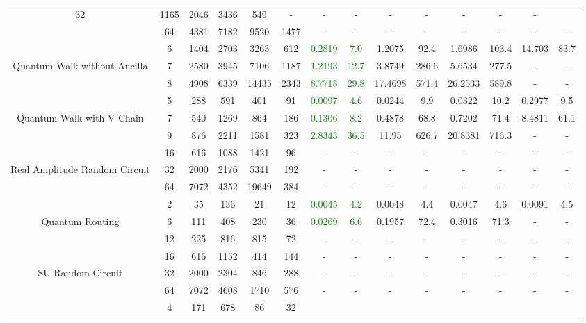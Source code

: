 \begin{table}[htb]
{\begin{tabular}{|c|c|c|c|c|c|c|c|c|c|c|c|c|c|}
32 & 1165 & 2046 & 3436 & 549
 & - & -
 & - & -
 & - & -
 & - & -
 \\
 & 
64 & 4381 & 7182 & 9520 & 1477
 & - & -
 & - & -
 & - & -
 & - & -
 \\
\hline
 & 
6 & 1404 & 2703 & 3263 & 612
 & \textcolor{green}{0.2819} & \textcolor{green}{7.0}
 & 1.2075 & 92.4
 & 1.6986 & 103.4
 & 14.703 & 83.7
 \\
Quantum Walk without Ancilla & 
7 & 2580 & 3945 & 7106 & 1187
 & \textcolor{green}{1.2193} & \textcolor{green}{12.7}
 & 3.8749 & 286.6
 & 5.6534 & 277.5
 & - & -
 \\
 & 
8 & 4908 & 6339 & 14435 & 2343
 & \textcolor{green}{8.7718} & \textcolor{green}{29.8}
 & 17.4698 & 571.4
 & 26.2533 & 589.8
 & - & -
 \\
\hline
 & 
5 & 288 & 591 & 401 & 91
 & \textcolor{green}{0.0097} & \textcolor{green}{4.6}
 & 0.0244 & 9.9
 & 0.0322 & 10.2
 & 0.2977 & 9.5
 \\
Quantum Walk with V-Chain & 
7 & 540 & 1269 & 864 & 186
 & \textcolor{green}{0.1306} & \textcolor{green}{8.2}
 & 0.4878 & 68.8
 & 0.7202 & 71.4
 & 8.4811 & 61.1
 \\
 & 
9 & 876 & 2211 & 1581 & 323
 & \textcolor{green}{2.8343} & \textcolor{green}{36.5}
 & 11.95 & 626.7
 & 20.8381 & 716.3
 & - & -
 \\
\hline
 & 
16 & 616 & 1088 & 1421 & 96
 & - & -
 & - & -
 & - & -
 & - & -
 \\
Real Amplitude Random Circuit & 
32 & 2000 & 2176 & 5341 & 192
 & - & -
 & - & -
 & - & -
 & - & -
 \\
 & 
64 & 7072 & 4352 & 19649 & 384
 & - & -
 & - & -
 & - & -
 & - & -
 \\
\hline
 & 
2 & 35 & 136 & 21 & 12
 & \textcolor{green}{0.0045} & \textcolor{green}{4.2}
 & 0.0048 & 4.4
 & 0.0047 & 4.6
 & 0.0091 & 4.5
 \\
Quantum Routing & 
6 & 111 & 408 & 230 & 36
 & \textcolor{green}{0.0269} & \textcolor{green}{6.6}
 & 0.1957 & 72.4
 & 0.3016 & 71.3
 & - & -
 \\
 & 
12 & 225 & 816 & 815 & 72
 & - & -
 & - & -
 & - & -
 & - & -
 \\
\hline
 & 
16 & 616 & 1152 & 414 & 144
 & - & -
 & - & -
 & - & -
 & - & -
 \\
SU Random Circuit & 
32 & 2000 & 2304 & 846 & 288
 & - & -
 & - & -
 & - & -
 & - & -
 \\
 & 
64 & 7072 & 4608 & 1710 & 576
 & - & -
 & - & -
 & - & -
 & - & -
 \\
\hline
 & 
4 & 171 & 678 & 86 & 32

\end{tabular}}
\end{table}
